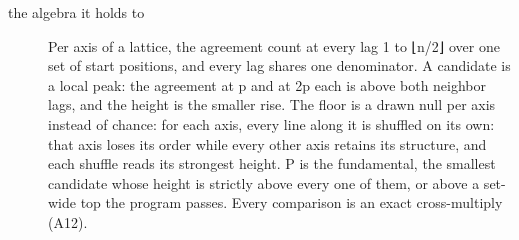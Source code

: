 \begin{description}
\item[{the algebra it holds to}] Per axis of a lattice, the agreement count at every lag 1 to ⌊n/2⌋ over one set of start positions, and every lag shares one denominator. A candidate is a local peak: the agreement at p and at 2p each is above both neighbor lags, and the height is the smaller rise. The floor is a drawn null per axis instead of chance: for each axis, every line along it is shuffled on its own: that axis loses its order while every other axis retains its structure, and each shuffle reads its strongest height. P is the fundamental, the smallest candidate whose height is strictly above every one of them, or above a set-wide top the program passes. Every comparison is an exact cross-multiply (A12).

\end{description}
